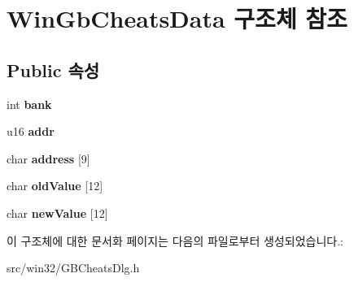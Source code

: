 \hypertarget{struct_win_gb_cheats_data}{}\section{Win\+Gb\+Cheats\+Data 구조체 참조}
\label{struct_win_gb_cheats_data}
\subsection*{Public 속성}
\begin{DoxyCompactItemize}
\item 
\mbox{\label{struct_win_gb_cheats_data_a3cbfcdcf0184d58e83261e2238385480}} 
int {\bfseries bank}
\item 
\mbox{\label{struct_win_gb_cheats_data_a80015100674ee2f689deb0f182ba6ca8}} 
u16 {\bfseries addr}
\item 
\mbox{\label{struct_win_gb_cheats_data_a7d260c5c47f95346767df3da6838221c}} 
char {\bfseries address} \mbox{[}9\mbox{]}
\item 
\mbox{\label{struct_win_gb_cheats_data_abe8e108df6ab1b40209bdc2e3e490c8a}} 
char {\bfseries old\+Value} \mbox{[}12\mbox{]}
\item 
\mbox{\label{struct_win_gb_cheats_data_a6fc49b4d1e4bb935624c98a337091eb9}} 
char {\bfseries new\+Value} \mbox{[}12\mbox{]}
\end{DoxyCompactItemize}


이 구조체에 대한 문서화 페이지는 다음의 파일로부터 생성되었습니다.\+:\begin{DoxyCompactItemize}
\item 
src/win32/G\+B\+Cheats\+Dlg.\+h\end{DoxyCompactItemize}
